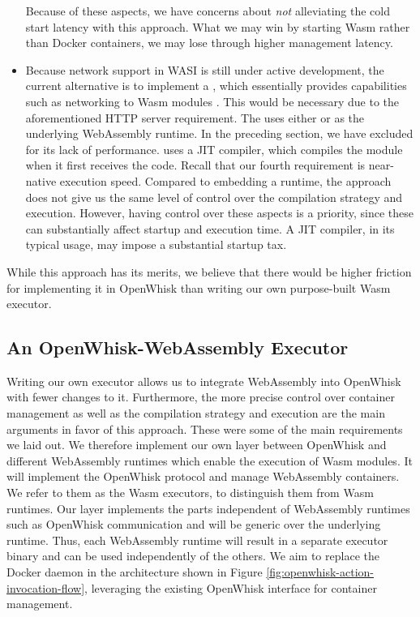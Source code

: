 \begin{itemize}
    Because of these aspects, we have concerns about \emph{not} alleviating the cold start latency with this approach. What we may win by starting Wasm rather than Docker containers, we may lose through higher management latency.
    \item Because network support in WASI is still under active development, the current alternative is to implement a , which essentially provides capabilities such as networking to Wasm modules \cite{WC2021}. This would be necessary due to the aforementioned HTTP server requirement. The  uses either  or  as the underlying WebAssembly runtime. In the preceding section, we have excluded  for its lack of performance.  uses a JIT compiler, which compiles the module when it first receives the code. Recall that our fourth requirement is near-native execution speed. Compared to embedding a runtime, the  approach does not give us the same level of control over the compilation strategy and execution. However, having control over these aspects is a priority, since these can substantially affect startup and execution time. A JIT compiler, in its typical usage, may impose a substantial startup tax.
\end{itemize}

While this approach has its merits, we believe that there would be higher friction for implementing it in OpenWhisk than writing our own purpose-built Wasm executor.

\subsection{An OpenWhisk-WebAssembly Executor}


Writing our own executor allows us to integrate WebAssembly into OpenWhisk with fewer changes to it. Furthermore, the more precise control over container management as well as the compilation strategy and execution are the main arguments in favor of this approach. These were some of the main requirements we laid out. We therefore implement our own layer between OpenWhisk and different WebAssembly runtimes which enable the execution of Wasm modules. It will implement the OpenWhisk protocol and manage WebAssembly containers. We refer to them as the Wasm executors, to distinguish them from Wasm runtimes. Our layer implements the parts independent of WebAssembly runtimes such as OpenWhisk communication and will be generic over the underlying runtime. Thus, each WebAssembly runtime will result in a separate executor binary and can be used independently of the others. We aim to replace the Docker daemon in the architecture shown in Figure \ref{fig:openwhisk-action-invocation-flow}, leveraging the existing OpenWhisk interface for container management.

